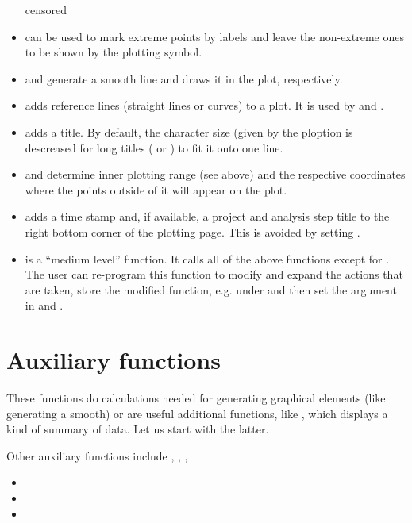 \documentclass[11pt]{article}\usepackage[]{graphicx}\usepackage[]{color}
\begin{document}
\begin{itemize}
  censored
\item
   can be used to mark extreme points by labels and leave the
  non-extreme ones to be shown by the plotting symbol.
\item
   and  generate a smooth line and draws it 
  in the plot, respectively.
\item
   adds reference lines (straight lines or curves) to a plot.
  It is used by  and .
\item
   adds a title. By default, the character size 
  (given by the ploption  is descreased
  for long titles ( or ) to fit it onto one line.
\item
   and  determine inner plotting range 
  (see above) and the respective coordinates where the points outside of it
  will appear on the plot.
\item
   adds a time stamp and, if available, a project and analysis
  step title to the right bottom corner of the plotting page.
  This is avoided by setting .
\item
   is a ``medium level'' function. It calls all of the above
  functions except for . 
  The user can re-program this function to modify and expand the actions that
  are taken, store the modified function, e.g. under 
  and then set %
  the argument  in  and .
\end{itemize}

\section{Auxiliary functions}
These functions do calculations needed for generating graphical elements
(like generating a smooth) or are useful additional functions,
like , which displays a kind of summary of data.
Let us start with the latter.

Other auxiliary functions include
,
,
,


\begin{itemize}
\item
\item 
\item
\end{itemize}
\end{document}
